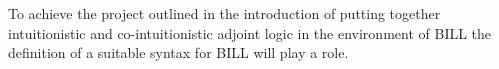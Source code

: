 To achieve the project outlined in the introduction of putting
together intuitionistic and co-intuitionistic adjoint logic in the
environment of BILL the definition of a suitable syntax for BILL will
play a role.



